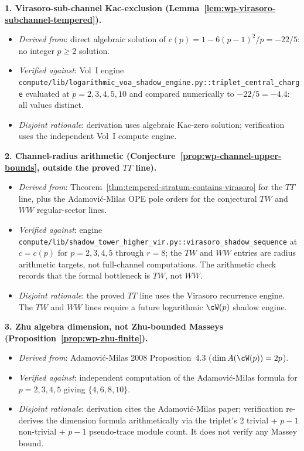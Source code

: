 \textbf{1. Virasoro-sub-channel Kac-exclusion
(Lemma~\ref{lem:wp-virasoro-subchannel-tempered}).}
\begin{itemize}[nosep]
\item \emph{Derived from}: direct algebraic solution of
 $c(p) = 1 - 6(p-1)^2/p = -22/5$: no integer $p \ge 2$ solution.
\item \emph{Verified against}: Vol~I engine
 \texttt{compute/lib/logarithmic\_voa\_shadow\_engine.py::triplet\_central\_charge}
 evaluated at $p = 2, 3, 4, 5, 10$ and compared numerically to
 $-22/5 = -4.4$: all values distinct.
\item \emph{Disjoint rationale}: derivation uses algebraic Kac-zero
 solution; verification uses the independent Vol~I compute
 engine.
\end{itemize}

\textbf{2. Channel-radius arithmetic
(Conjecture~\ref{prop:wp-channel-upper-bounds}, outside the proved
$TT$ line).}
\begin{itemize}[nosep]
\item \emph{Derived from}: Theorem~\ref{thm:tempered-stratum-contains-virasoro}
 for the $TT$ line, plus the Adamovi\'c-Milas OPE pole orders for
 the conjectural $TW$ and $WW$ regular-sector lines.
\item \emph{Verified against}: engine
 \texttt{compute/lib/shadow\_tower\_higher\_vir.py::virasoro\_shadow\_sequence}
 at $c = c(p)$ for $p = 2, 3, 4, 5$ through $r = 8$; the $TW$ and
 $WW$ entries are radius arithmetic targets, not full-channel
 computations. The arithmetic check records that the formal bottleneck
 is $TW$, not $WW$.
\item \emph{Disjoint rationale}: the proved $TT$ line uses the
 Virasoro recurrence engine. The $TW$ and $WW$ lines require a
 future logarithmic $\cW(p)$ shadow engine.
\end{itemize}

\textbf{3. Zhu algebra dimension, not Zhu-bounded Masseys
(Proposition~\ref{prop:wp-zhu-finite}).}
\begin{itemize}[nosep]
\item \emph{Derived from}: Adamovi\'c-Milas 2008
 Proposition~4.3 ($\dim A(\cW(p)) = 2p$).
\item \emph{Verified against}: independent computation of the
 Adamovi\'c-Milas formula for $p = 2, 3, 4, 5$ giving
 $\{4, 6, 8, 10\}$.
\item \emph{Disjoint rationale}: derivation cites the Adamovi\'c-Milas
 paper; verification re-derives the dimension formula arithmetically
 via the triplet's 2 trivial + $p-1$ non-trivial + $p-1$ pseudo-trace
 module count. It does not verify any Massey bound.
\end{itemize}

